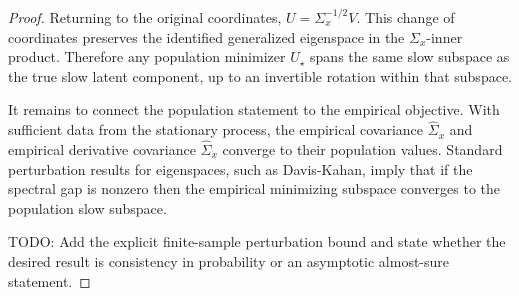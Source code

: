 \begin{proof}
Returning to the original coordinates, $U=\Sigma_x^{-1/2}V$. This change of
coordinates preserves the identified generalized eigenspace in the
$\Sigma_x$-inner product. Therefore any population minimizer $U_\star$ spans
the same slow subspace as the true slow latent component, up to an invertible
rotation within that subspace.

It remains to connect the population statement to the empirical objective. With
sufficient data from the stationary process, the empirical covariance
$\widehat{\Sigma}_x$ and empirical derivative covariance
$\widehat{\Sigma}_{\dot{x}}$ converge to their population values. Standard
perturbation results for eigenspaces, such as Davis-Kahan, imply that if the
spectral gap is nonzero then the empirical minimizing subspace converges to
the population slow subspace.

TODO: Add the explicit finite-sample perturbation bound and state whether the
desired result is consistency in probability or an asymptotic almost-sure
statement.
\end{proof}
